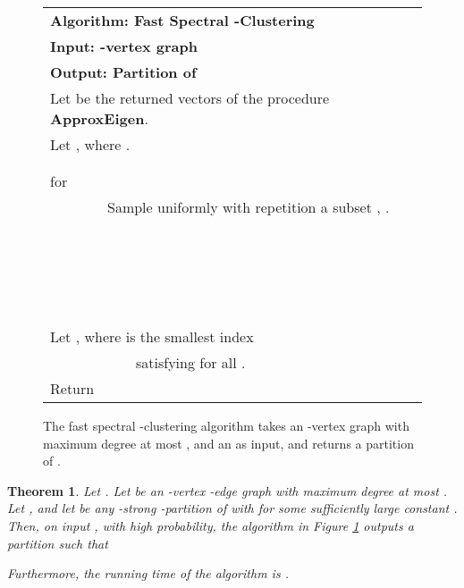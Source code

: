 \documentclass[11pt]{article}
\theoremstyle{plain}
\newtheorem{theorem}{Theorem}[section]
\begin{document}
\begin{figure}
\begin{center}
\begin{tabularx}{\textwidth}{l}
\toprule
\textbf{Algorithm: Fast Spectral -Clustering}\\
\textbf{Input: -vertex graph }\\
\textbf{Output: Partition  of }\\
\midrule
Let  be the returned vectors of the procedure \textbf{ApproxEigen}. \\
Let , where . \\
 \\
 \\
for  \\
~~~~~~~~Sample uniformly with repetition a subset , . \\
~~~~~~~~ \\
~~~~~~~~~~~~ \\
~~~~~~~~ \\
~~~~~~~~ \\
Let ,  where  is the smallest index \\
~~~~~~~~~~~~satisfying  for all . \\
Return  \\
\bottomrule
\end{tabularx}
\end{center}
\caption{The fast spectral -clustering algorithm takes an -vertex graph
     with maximum degree at most , and
    an  as input, and returns a partition 
    of . \label{fig:algorithm2}}
\end{figure}

\begin{theorem}\label{thm:algorithm2}
Let . Let  be an -vertex -edge graph with maximum
degree at most . Let , and let
 be any -strong
-partition of  with  for some
sufficiently large constant . Then, on input , with high probability,
the algorithm in Figure \ref{fig:algorithm2} outputs a partition  such
that

Furthermore, the running time of the algorithm is .
\end{theorem}
\end{document}
